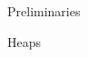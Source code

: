 \documentclass[11pt]{amsart}
\theoremstyle{definition}
\numberwithin{equation}{section}
\newcommand{\C}{\widetilde{C}}
\renewcommand{\(}{\left(}
\renewcommand{\)}{\right)}
\DeclareMathOperator{\FC}{FC}
\newcommand\xxaxis{0}
\newcommand\yyaxis{90}
\newcommand\heapblock[3]{\fill[draw=black, fill=gray!30, rounded corners, line width=1.1pt, shift={(\xxaxis:#1)},shift={(\yyaxis:#2)}] (-1,-0.5) rectangle (1,0.5);\node at (#1,#2) {$#3$};}
\newcommand\heapblank[2]{\fill[fill=white, dotted, draw=black, line width=1.1pt, rounded corners, shift={(\xxaxis:#1)},shift={(\yyaxis:#2)}] (-1,-0.5) rectangle (1,0.5);}
\begin{document}
\begin{section}{Preliminaries}
\begin{subsection}{Heaps}

\end{subsection}

\end{section}











\end{document}
